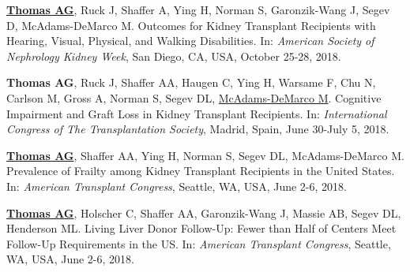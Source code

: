 \documentclass[10pt]{article}
\makeatletter
\newlength{\bibhang}
\newlength{\bibsep}
 {\@listi \global\bibsep\itemsep \global\advance\bibsep by\parsep}
\newenvironment{bibenum*}
  {\renewcommand\labelenumi{[\theenumi]}%
   \etaremune[
     topsep=0pt,
     itemsep=\bibsep,
     parsep=0pt,partopsep=0pt,
     itemindent=-\bibhang,
     leftmargin={\bibhang+\widthof{[999]}}]}
  {\endetaremune}
\makeatother
\begin{document}
\begin{bibenum*}
\item \underline{\textbf{Thomas AG}}, Ruck J, Shaffer A, Ying H, Norman S,
  Garonzik-Wang J, Segev D, McAdams-DeMarco M.
  Outcomes for Kidney Transplant Recipients with Hearing, Visual, Physical,
  and Walking Disabilities.
  In: \emph{American Society of Nephrology Kidney Week},
  San Diego, CA, USA, October 25-28, 2018.


\item \textbf{Thomas AG}, Ruck J, Shaffer AA, Haugen C, Ying H,
  Warsame F, Chu N, Carlson M, Gross A, Norman S,
  Segev DL, \underline{McAdams-DeMarco M}.
  Cognitive Impairment and Graft Loss in Kidney Transplant Recipients.
  In: \emph{International Congress of The Transplantation Society},
  Madrid, Spain, June 30-July 5, 2018.



\item \underline{\textbf{Thomas AG}}, Shaffer AA, Ying H, Norman S,
  Segev DL, McAdams-DeMarco M.
  Prevalence of Frailty among Kidney Transplant Recipients in the United States.
  In: \emph{American Transplant Congress},
  Seattle, WA, USA, June 2-6, 2018.

\item \underline{\textbf{Thomas AG}}, Holscher C, Shaffer AA,
  Garonzik-Wang J, Massie AB, Segev DL, Henderson ML.
  Living Liver Donor Follow-Up: Fewer than Half of
  Centers Meet Follow-Up Requirements in the US.
  In: \emph{American Transplant Congress},
  Seattle, WA, USA, June 2-6, 2018.


\end{bibenum*}
\end{document}

